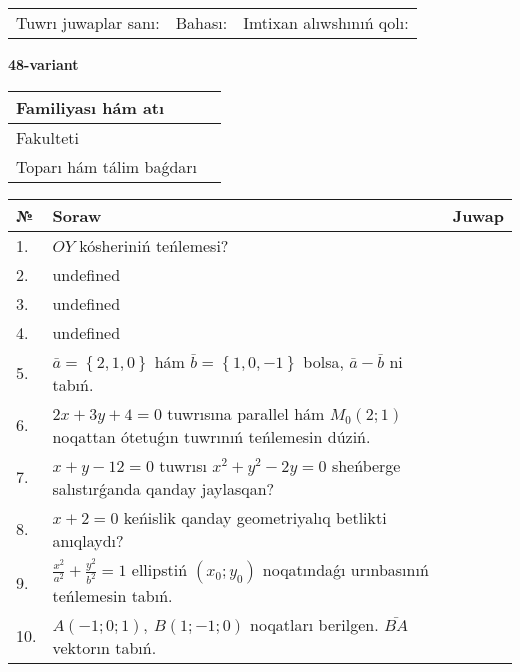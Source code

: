 \documentclass{article}
\begin{document}
\vspace{0.7cm}

\begin{tabular}{lll}
Tuwrı juwaplar sanı: \underline{\hspace{1cm}} & 
Bahası: \underline{\hspace{1cm}} & 
Imtixan alıwshınıń qolı: \underline{\hspace{2cm}} \\
\end{tabular}

\egroup

\newpage


\textbf{48-variant}\\

\bgroup
\def\arraystretch{1.6} %

\begin{tabular}{|m{5.7cm}|m{9.5cm}|}
\hline
Familiyası hám atı & \\
\hline
Fakulteti  & \\
\hline
Toparı hám tálim baǵdarı  & \\
\hline
\end{tabular}

\vspace{0.7cm}

\begin{tabular}{|m{0.7cm}|m{10cm}|m{4cm}|}
\hline
№ & Soraw & Juwap \\
\hline
1. & \(OY\) kósheriniń teńlemesi? &  \\
\hline
2. & undefined &  \\
\hline
3. & undefined &  \\
\hline
4. & undefined &  \\
\hline
5. & \(\bar{a} = \left\{ 2, 1, 0 \right\}\) hám \(\bar{b} = \left\{ 1, 0,- 1 \right\}\) bolsa, \(\bar{a} - \bar{b}\) ni tabıń. &  \\
\hline
6. & \(2 x + 3 y + 4 = 0\) tuwrısına parallel hám \(M_{0} (2;1)\) noqattan ótetuǵın tuwrınıń teńlemesin dúziń. &  \\
\hline
7. & \(x + y - 12 = 0\) tuwrısı \(x^{2} + y^{2} - 2 y = 0\) sheńberge salıstırǵanda qanday jaylasqan? &  \\
\hline
8. & \(x + 2 = 0\) keńislik qanday geometriyalıq betlikti anıqlaydı? &  \\
\hline
9. & \(\frac{x^{2}}{a^{2}} + \frac{y^{2}}{b^{2}} = 1\) ellipstiń \((x_{0};y_{0})\) noqatındaǵı urınbasınıń teńlemesin tabıń. &  \\
\hline
10. & \(A (- 1;0;1),\ B (1; - 1;0)\) noqatları berilgen. \(\bar{BA}\) vektorın tabıń. & \\
\hline
\end{tabular}
\end{document}
